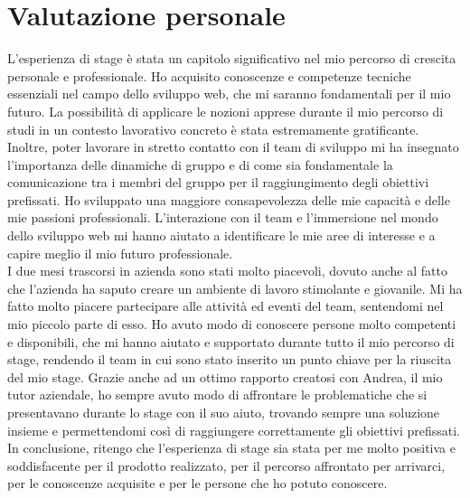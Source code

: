 
\section{Valutazione personale}
L'esperienza di stage è stata un capitolo significativo nel mio percorso di crescita personale e professionale.
Ho acquisito conoscenze e competenze tecniche essenziali nel campo dello sviluppo web, che mi saranno fondamentali per il mio futuro.
La possibilità di applicare le nozioni apprese durante il mio percorso di studi in un contesto lavorativo concreto è stata estremamente gratificante.
Inoltre, poter lavorare in stretto contatto con il team di sviluppo mi ha insegnato l'importanza delle dinamiche di gruppo e di come sia fondamentale la comunicazione tra i membri del gruppo per il raggiungimento degli obiettivi prefissati.
Ho sviluppato una maggiore consapevolezza delle mie capacità e delle mie passioni professionali. L'interazione con il team e l'immersione nel mondo dello sviluppo web
mi hanno aiutato a identificare le mie aree di interesse e a capire meglio il mio futuro professionale.\\

I due mesi trascorsi in azienda sono stati molto piacevoli, dovuto anche al fatto che l'azienda ha saputo creare un ambiente di lavoro stimolante e giovanile.
Mi ha fatto molto piacere partecipare alle attività ed eventi del team, sentendomi nel mio piccolo parte di esso.
Ho avuto modo di conoscere persone molto competenti e disponibili, che mi hanno aiutato e supportato durante tutto il mio percorso di stage, rendendo il team in cui sono stato inserito un punto chiave per la riuscita del mio stage.
Grazie anche ad un ottimo rapporto creatosi con Andrea, il mio tutor aziendale, ho sempre avuto modo di affrontare le problematiche che si presentavano durante lo stage con il suo aiuto, trovando sempre una soluzione insieme e permettendomi così di raggiungere correttamente gli obiettivi prefissati.\\

In conclusione, ritengo che l'esperienza di stage sia stata per me molto positiva e soddisfacente per il prodotto realizzato, per il percorso affrontato per arrivarci, per le conoscenze acquisite e per le persone che ho potuto conoscere.


